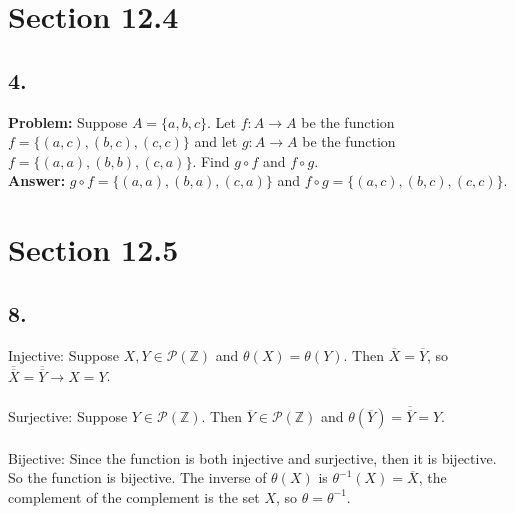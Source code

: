 \documentclass[12pt]{article}
\begin{document}
\begin{minipage}[t]{0.45\textwidth}

\section*{Section 12.4}
\subsection*{4.}
\textbf{Problem:} Suppose $ A=\{a,b,c\} $. Let $ f:A\rightarrow A $ be the function $ f=\{(a,c),(b,c),(c,c)\} $ and let $ g:A\rightarrow A $ be the function $ f=\{(a,a),(b,b),(c,a)\} $. Find $ g\circ f$ and $ f\circ g $.
\\\textbf{Answer: } $ g\circ f =\{(a,a),(b,a),(c,a)\}$ and $ f\circ g =\{(a,c),(b,c),(c,c)\}$.

\section*{Section 12.5}
\subsection*{8.}
Injective: Suppose $ X,Y\in\mathscr{P}(\mathbb{Z}) $ and $ \theta(X)=\theta(Y) $. Then $ \overline{X}=\overline{Y} $, so  $ \overline{\overline{X}}=\overline{\overline{Y}} \rightarrow X=Y $.
\\\\Surjective: Suppose $ Y\in\mathscr{P}(\mathbb{Z}) $. Then $ \overline{Y}\in\mathscr{P}(\mathbb{Z}) $ and $ \theta(\overline{Y})=\overline{\overline{Y}}=Y $.
\\\\Bijective: Since the function is both injective and surjective, then it is bijective.
\\ So the function is bijective. The inverse of $ \theta(X) $ is $ \theta^{-1} (X)=\overline{X}$, the complement of the complement is the set $ X $, so $ \theta = \theta^{-1} $.

\end{minipage}
\pagebreak


\end{document}
